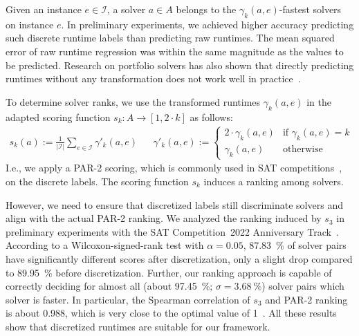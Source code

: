 \documentclass[runningheads]{llncs}
\begin{document}
Given an instance $e \in \mathcal{I}$, a solver $a \in A$ belongs to the $\gamma_k(a, e)$-fastest solvers on instance $e$. 
In preliminary experiments, we achieved higher accuracy predicting such discrete runtime labels than predicting raw runtimes. 
The mean squared error of raw runtime regression was within the same magnitude as the values to be predicted. 
Research on portfolio solvers has also shown that directly predicting runtimes without any transformation does not work well in practice~\cite{CollauttiMMO13,NgokoCT19}.

To determine solver ranks, we use the transformed runtimes $\gamma_k(a, e)$ in the adapted scoring function $s_k : A \rightarrow [1, 2 \cdot k]$ as follows:
%
\begin{align}
  s_k(a) := \frac{1}{|\mathcal{I}|} \sum_{e \in \mathcal{I}} \gamma'_k(a, e)
  &&
  \gamma'_k(a, e) := \begin{cases}
  	2 \cdot \gamma_k(a, e) 	& \text{if } \gamma_k(a, e) = k\\
	\gamma_k(a, e)	& \text{otherwise}
  \end{cases}
  \label{eq:rankingeq}
\end{align}
%
I.e., we apply a PAR-2 scoring, which is commonly used in SAT competitions~\cite{FroleyksHIJS21}, on the discrete labels.
The scoring function $s_k$ induces a ranking among solvers.
 
However, we need to ensure that discretized labels still discriminate solvers and align with the actual PAR-2 ranking.
We analyzed the ranking induced by $s_3$ in preliminary experiments with the SAT Competition~2022 Anniversary Track~\cite{sat2022}.
According to a Wilcoxon-signed-rank test with $\alpha = 0.05$, \SI{87.83}{\%} of solver pairs have significantly different scores after discretization, only a slight drop compared to \SI{89.95}{\%} before discretization.
Further, our ranking approach is capable of correctly deciding for almost all (about \SI{97.45}{\%}; $\sigma = \SI{3.68}{\%}$) solver pairs which solver is faster.
In particular, the Spearman correlation of $s_3$ and PAR-2 ranking is about \SI{0.988}{}, which is very close to the optimal value of 1~\cite{de2016comparing}.
All these results show that discretized runtimes are suitable for our framework.
\end{document}
